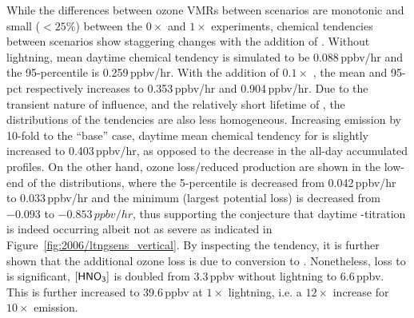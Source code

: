 
While the differences between ozone VMRs between scenarios are monotonic and small ($<25\%$) between the $0\times$
and $1\times$ experiments, chemical tendencies between scenarios show staggering changes with the addition of {\lnox}. Without lightning,
mean daytime chemical tendency is simulated to be 0.088\,\unit{ppbv/hr} and the 95-percentile is 0.259\,\unit{ppbv/hr}. With the
addition of $0.1\times$ {\lnox}, the mean and 95-pct respectively increases to 0.353\,\unit{ppbv/hr} and 0.904\,\unit{ppbv/hr}. Due to
the transient nature of {\lnox} influence, and the relatively short lifetime of , the distributions of the tendencies are
also less homogeneous. Increasing {\lnox} emission by 10-fold to the ``base'' case, daytime mean chemical tendency for 
is slightly increased to 0.403\,\unit{ppbv/hr}, as opposed to the decrease in the all-day accumulated profiles. On the other hand, ozone
loss/reduced production are shown in the low-end of the distributions, where the 5-percentile is decreased from 0.042\,\unit{ppbv/hr}
to 0.033\,\unit{ppbv/hr} and the minimum (largest potential loss) is decreased from $-0.093$ to $-0.853\,\unit{ppbv/hr}$, thus 
supporting the conjecture that daytime -titration is indeed occurring albeit not as severe as indicated in
Figure~\ref{fig:2006/ltngsens_vertical}. By inspecting the  tendency, it is further shown that the additional ozone loss
is due to conversion to . Nonetheless, loss to  is significant, $[\chem{HNO_3}]$ is doubled from 3.3\,\unit{ppbv}
without lightning to 6.6\,\unit{ppbv}. This is further increased to 39.6\,\unit{ppbv} at $1\times$ lightning, i.e. a $12\times$ increase
for $10\times$ {\lnox} emission.


